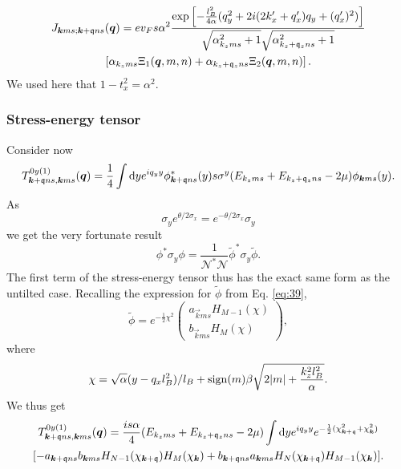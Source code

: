 \begin{multline}
  J_{\bm{k} m s; \bm{k} + \mathfrak{q} n s} (\bm{q}) =
  e v_F s \alpha^2
  \frac{
    \exp \left[
      -\frac{l_{B}^2}{4 \alpha } (q_{y}^2 + 2i (2 k' _x + q' _x) q_{y} + (q'_x)^2 )
    \right]
  }{
    \sqrt{\alpha_{k_z m s}^2 + 1} \sqrt{\alpha_{k_z + \mathfrak{q}_z n s}^2 + 1}
  }\\
  \left[
     \alpha_{k_z m s} \Xi_1(\bm{q}, m, n) + \alpha_{k_z + \mathfrak{q}_z n s} \Xi_2(\bm{q}, m, n)
  \right].
\end{multline}
We used here that \( 1 - t_x^2 = \alpha^2 \).

\subsubsection{Stress-energy tensor}
Consider now
\begin{equation}
  \label{eq:86}
  T_{\bm{k} + \mathfrak{q} n s, \bm{k} m s}^{0y(1)} (\bm{q}) =
  \frac{1}{4}
  \int \mathrm{d} y
  e^{i q_{y} y}
  \phi ^{*}_{\bm{k} + \mathfrak{q} n s}(y) s \sigma ^{y}
  (E_{k_z m  s} + E_{k_z+\mathfrak{q}_z n s} - 2 \mu)
  \phi _{\bm{k} m s} (y).
\end{equation}
As
\begin{equation}
  \label{eq:87}
  \sigma _{y} e^{\theta /2 \sigma _{x}} = e^{-\theta /2 \sigma _{x}} \sigma _{y}
\end{equation}
we get the very fortunate result
\begin{equation}
  \label{eq:88}
  \phi^{*} \sigma _{y} \phi = \frac{1}{\mathcal{N}^{*} \mathcal{N}} \tilde{\phi}^{*} \sigma _{y} \tilde{\phi}.
\end{equation}
The first term of the stress-energy tensor thus has the exact same form as the untilted case.
Recalling the expression for \(\tilde{\phi}\) from Eq. \eqref{eq:39},
\[
  \tilde{\phi} = e^{-\frac{1}{2} \chi ^2}
  \begin{pmatrix}
    a_{\vec{k} m s} H_{M-1} (\chi)\\
    b_{\vec{k} m s} H_{M} (\chi)
  \end{pmatrix},
\]
where
\[
\chi = \sqrt{\alpha} (y - q_{x} l_{B}^2 ) /l_{B} + \operatorname{sign}(m) \beta \sqrt{2 |m| + \frac{k_{z}^2 l_{B}^2}{\alpha }}.
\]
We thus get
\begin{multline}
  \label{eq:89}
  T_{\vec{k}+\qvec{q} ns, \vec{k} m s}^{0y (1)} (\vec{q}) =
  \frac{is \alpha}{4} (E_{k_z m s} + E_{k_z + \qvec{q}_z n s} - 2 \mu)
  \int \mathrm{d} y
  e^{i q_{y} y}
  e^{-\frac{1}{2} (\chi_{\vec{k}+\qvec{q}}^2 + \chi_{\vec{k}} ^2) }\\
  [
  -a_{\vec{k} + \qvec{q} ns} b_{\vec{k} m s} H_{N-1} (\chi_{\vec{k} + \qvec{q}}) H_{M} (\chi_{\vec{k}})
  + b_{\vec{k} + \qvec{q} n s} a_{\vec{k} ms} H_{N}(\chi_{\vec{k} + \qvec{q}}) H_{M-1} (\chi_{\vec{k}})
  ].
\end{multline}
